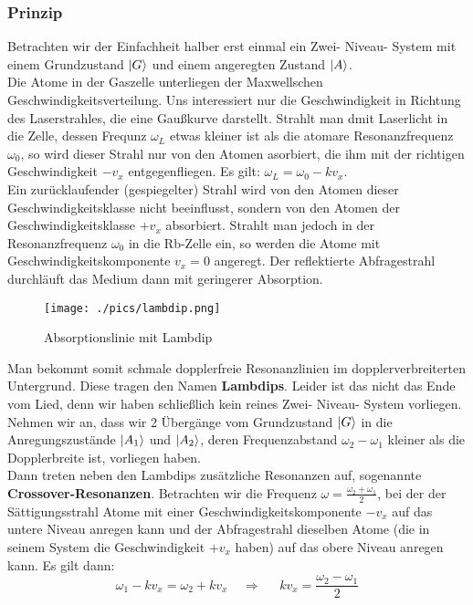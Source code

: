 \documentclass[a4paper,oneside]{article}
\begin{document}
\subsubsection{Prinzip}
Betrachten wir der Einfachheit halber erst einmal ein Zwei- Niveau- System mit einem Grundzustand $\ket{G}$ und einem angeregten Zustand $\ket{A}$.\\
Die Atome in der Gaszelle unterliegen der Maxwellschen Geschwindigkeitsverteilung. Uns interessiert nur die Geschwindigkeit in Richtung des Laserstrahles, die eine Gaußkurve darstellt. Strahlt man dmit Laserlicht in die Zelle, dessen Frequnz $\omega_L$ etwas kleiner ist als die atomare Resonanzfrequenz $\omega_0$, so wird dieser Strahl nur von den Atomen asorbiert, die ihm mit der richtigen Geschwindigkeit $-v_x$ entgegenfliegen. Es gilt: $\omega_L=\omega_0-kv_x$.\\
Ein zurücklaufender (gespiegelter) Strahl wird von den Atomen dieser Geschwindigkeitsklasse nicht beeinflusst, sondern von den Atomen der Geschwindigkeitsklasse $+v_x$ absorbiert. Strahlt man jedoch in der Resonanzfrequenz $\omega_0$ in die Rb-Zelle ein, so werden die Atome mit Geschwindigkeitskomponente $v_x=0$ angeregt. Der reflektierte Abfragestrahl durchläuft das Medium dann mit geringerer Absorption.\\
\begin{figure}
 \centering
 \texttt{[image: ./pics/lambdip.png]}
 \caption{Absorptionslinie mit Lambdip}
\end{figure}
Man bekommt somit schmale dopplerfreie Resonanzlinien im dopplerverbreiterten Untergrund. Diese tragen den Namen \textbf{Lambdips}. Leider ist das nicht das Ende vom Lied, denn wir haben schließlich kein reines Zwei- Niveau- System vorliegen. Nehmen wir an, dass wir 2 Übergänge vom Grundzustand $\ket{G}$ in die Anregungszustände $\ket{A_1}$ und $\ket{A_2}$, deren Frequenzabstand $\omega_2-\omega_1$ kleiner als die Dopplerbreite ist, vorliegen haben.\\
Dann treten neben den Lambdips zusätzliche Resonanzen auf, sogenannte \textbf{Crossover-Resonanzen}. Betrachten wir die Frequenz $\omega=\frac{\omega_2+\omega_1}{2}$, bei der der Sättigungsstrahl Atome mit einer Geschwindigkeitskomponente $-v_x$ auf das untere Niveau anregen kann und der Abfragestrahl dieselben Atome (die in seinem System die Geschwindigkeit $+v_x$ haben) auf das obere Niveau anregen kann. Es gilt dann:
\begin{equation}
 \omega_1-kv_x=\omega_2+kv_x\;\;\;\;\Longrightarrow\;\;\;\;\; kv_x=\frac{\omega_2-\omega_1}{2}
\end{equation}
\end{document}
